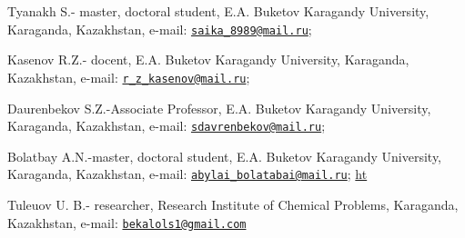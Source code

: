\begin{authorinfo}
Tyanakh S.- master, doctoral student, E.A. Buketov Karagandy University,
Karaganda, Kazakhstan, e-mail:
\href{mailto:saika_8989@mail.ru}{\nolinkurl{saika\_8989@mail.ru}};

Kasenov R.Z.- docent, E.A. Buketov Karagandy University, Karaganda,
Kazakhstan, e-mail:
\href{mailto:r_z_kasenov@mail.ru}{\nolinkurl{r\_z\_kasenov@mail.ru}};

Daurenbekov S.Z.-Associate Professor, E.A. Buketov Karagandy University,
Karaganda, Kazakhstan, e-mail:
\href{mailto:sdavrenbekov@mail.ru}{\nolinkurl{sdavrenbekov@mail.ru}};

Bolatbay A.N.-master, doctoral student, E.A. Buketov Karagandy
University, Karaganda, Kazakhstan, e-mail:
\href{mailto:abylai_bolatabai@mail.ru}{\nolinkurl{abylai\_bolatabai@mail.ru}};
\href{https://orcid.org/0000-0001-5047-3066}{ht}

Tuleuov U. B.- researcher, Research Institute of Chemical Problems,
Karaganda, Kazakhstan, e-mail:
\href{mailto:bekalols1@gmail.com}{\nolinkurl{bekalols1@gmail.com}}
\end{authorinfo}
